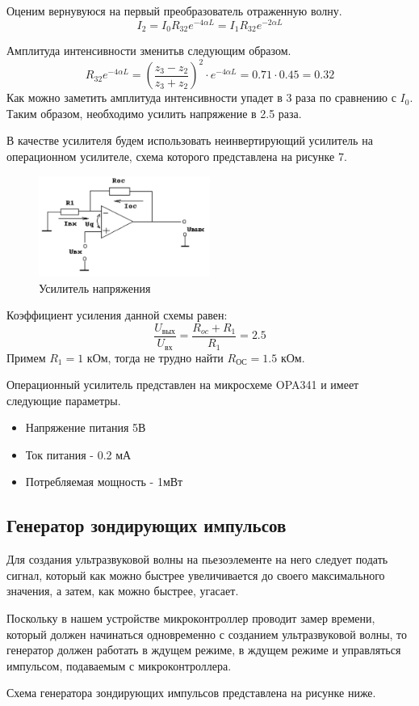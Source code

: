 \documentclass[russian, utf8, 12pt]{eskdtext}
\begin{document}
Оценим вернувуюся на первый преобразователь отраженную волну.
\begin{equation}
	I_2 = I_0R_{32} e^{-4\alpha L} = I_1 R_{32} e^{-2\alpha L}
\end{equation}

Амплитуда интенсивности зменитьв следующим образом.
\begin{equation}
	R_{32} e^{-4\alpha L} = \left( \frac{z_3 - z_2}{z_3 + z_2} \right)^2 \cdot e^{-4\alpha L} = 0.71 \cdot 0.45 = 0.32
\end{equation}
Как можно заметить амплитуда интенсивности упадет в 3 раза по сравнению с $I_0$. Таким образом, необходимо усилить напряжение в 2.5 раза.

В качестве усилителя будем использовать неинвертирующий усилитель на операционном усилителе, схема которого представлена на рисунке 7. 

\begin{figure}[h!]
	\begin{center}
	\includegraphics[width = 0.5\textwidth] {OY.png}
	\end{center}
	\caption{Усилитель напряжения}
\end{figure}

Коэффициент усиления данной схемы равен:
\begin{equation}
\frac{U_\text{вых}}{U_\text{вх}} = \frac{R_{oc} + R_1}{R_1} = 2.5
\end{equation}
Примем $R_1 = 1$ кОм, тогда не трудно найти $R_\text{ОС} = 1.5$ кОм.

Операционный усилитель представлен на микросхеме OPA341 и имеет следующие параметры.
\begin{itemize}
	\item Напряжение питания 5В
	\item Ток питания - 0.2 мА
	\item Потребляемая мощность - 1мВт
\end{itemize}
\subsection{Генератор зондирующих импульсов}
Для создания ультразвуковой волны на пьезоэлементе на него следует подать сигнал, который как можно быстрее увеличивается до своего максимального значения, а затем, как можно быстрее, угасает.\par
 Поскольку в нашем устройстве микроконтроллер проводит замер времени, который должен начинаться одновременно с созданием ультразвуковой волны, то генератор должен работать в ждущем режиме, в ждущем режиме и управляться импульсом, подаваемым с микроконтроллера. \par 
Схема генератора зондирующих импульсов представлена на рисунке ниже.
\end{document}
